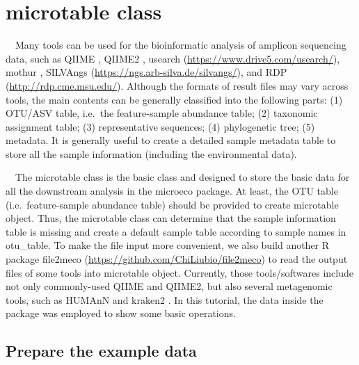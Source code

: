 \documentclass[
]{book}
\begin{document}
\hypertarget{microtable-class}{%
\section{microtable class}\label{microtable-class}}

　Many tools can be used for the bioinformatic analysis of amplicon sequencing data, such as QIIME \citep{Caporaso_QIIME_2010}, QIIME2 \citep{Bolyen_Reproducible_2019},
usearch (\url{https://www.drive5.com/usearch/}), mothur \citep{Schloss_Introducing_2009},
SILVAngs (\url{https://ngs.arb-silva.de/silvangs/}),
and RDP (\url{http://rdp.cme.msu.edu/}).
Although the formats of result files may vary across tools, the main contents can be generally classified into the following parts:
(1) OTU/ASV table, i.e.~the feature-sample abundance table;
(2) taxonomic assignment table;
(3) representative sequences;
(4) phylogenetic tree;
(5) metadata.
It is generally useful to create a detailed sample metadata table to store all the sample information (including the environmental data).

　The microtable class is the basic class and designed to store the basic data for all the downstream analysis in the microeco package.
At least, the OTU table (i.e.~feature-sample abundance table) should be provided to create microtable object.
Thus, the microtable class can determine that the sample information table is missing and create a default sample table according to
sample names in otu\_table.
To make the file input more convenient,
we also build another R package file2meco (\url{https://github.com/ChiLiubio/file2meco}) to read the output files of some tools into microtable object.
Currently, those tools/softwares include not only commonly-used QIIME \citep{Caporaso_QIIME_2010} and QIIME2\citep{Bolyen_Reproducible_2019},
but also several metagenomic tools, such as HUMAnN \citep{Franzosa_Species_2018} and kraken2 \citep{Wood_Improved_2019}.
In this tutorial, the data inside the package was employed to show some basic operations.

\hypertarget{prepare-the-example-data}{%
\subsection{Prepare the example data}\label{prepare-the-example-data}}
\end{document}
